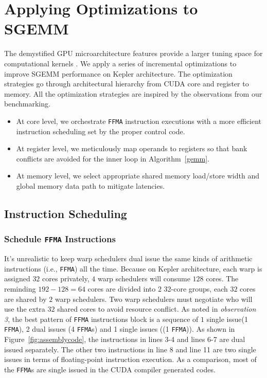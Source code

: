\section{Applying Optimizations to SGEMM}
\label{sec:optimization}


The demystified GPU microarchitecture features provide a larger tuning space for computational kernels .
We apply
a series of incremental optimizations to improve SGEMM performance on Kepler architecture. The optimization strategies
go through architectural hierarchy from CUDA core and register to memory. All the optimization strategies are inspired by the observations from our benchmarking.
\begin{itemize}
\item At core level, we orchestrate {\tt FFMA} instruction executions with a more efficient instruction scheduling set by the proper control code.
\item At register level, we meticulously map operands to registers so that bank conflicts are avoided for the inner loop in Algorithm~\ref{gemm}.
\item At memory level, we select appropriate shared memory load/store width and global memory data path to mitigate
latencies.
\end{itemize}

\subsection{Instruction Scheduling}
\subsubsection{Schedule {\tt FFMA} Instructions}
It's unrealistic to keep warp schedulers dual issue the same kinds of arithmetic instructions (i.e., {\tt FFMA}) all
the time. Because on Kepler architecture, each warp is assigned $32$ cores privately, $4$ warp schedulers will consume
$128$ cores. The reminding $192-128=64$ cores are divided into $2$ 32-core groups, each $32$ cores
are shared by $2$ warp schedulers. Two warp schedulers must negotiate who will use the extra $32$ shared cores to avoid
resource conflict.
As noted in {\em observation 3}, the best pattern of {\tt FFMA} instructions block is a sequence of $1$ single issue(1
{\tt FFMA}), 2 dual issues (4 {\tt FFMA}s) and 1 single issues ((1 {\tt FFMA})). As shown in
Figure~\ref{fig:assemblycode}, the instructions in lines 3-4 and lines 6-7 are dual issued separately.
The other two instructions in line 8 and line 11 are two single issues in terms of floating-point instruction
execution.
As a comparison, most of the {\tt FFMA}s are single issued in the CUDA compiler generated codes.

